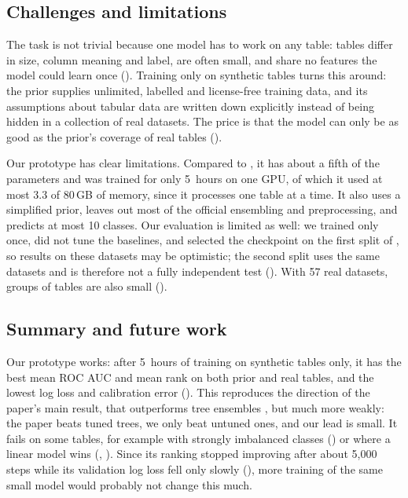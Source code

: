 \subsection{Challenges and limitations}\label{sec:challenges}

The task is not trivial because one model has to work on any table: tables
differ in size, column meaning and label, are often small, and share no
features the model could learn once (). Training only
on synthetic tables turns this around: the prior supplies unlimited,
labelled and license-free training data, and its assumptions about tabular
data are written down explicitly instead of being hidden in a collection of
real datasets. The price is that the model can only be as good as the
prior's coverage of real tables ().

Our prototype has clear limitations. Compared to \tabicl{}, it has about a
fifth of the parameters and was trained for only 5~hours on one GPU, of
which it used at most 3.3 of 80\,GB of memory, since it processes one table
at a time. It also uses a simplified prior, leaves out most of the official
ensembling and preprocessing, and predicts at most 10 classes. Our
evaluation is limited as well: we trained only once, did not tune the
baselines, and selected the checkpoint on the first split of \tabpfnval{},
so results on these datasets may be optimistic; the second split uses the
same datasets and is therefore not a fully independent test
(). With 57 real datasets, groups of tables are
also small ().

\subsection{Summary and future work}\label{sec:summary}

Our prototype works: after 5~hours of training on synthetic tables only, it
has the best mean ROC AUC and mean rank on both prior and real tables, and
the lowest log loss and calibration error (). This
reproduces the direction of the paper's main result, that \tabicl{}
outperforms tree ensembles \citep{qu2026tabiclv2}, but much more weakly: the
paper beats tuned trees, we only beat untuned ones, and our lead is small. It
fails on some tables, for example with strongly imbalanced classes
() or where a linear model wins (,
). Since its ranking stopped improving after about
5{,}000 steps while its validation log loss fell only slowly
(), more training of the same small model would probably
not change this much.

